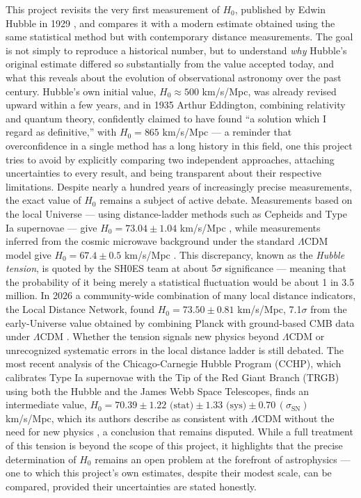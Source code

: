 \documentclass[11pt]{article}
\begin{document}
This project revisits the very first measurement of $H_0$, published by Edwin Hubble in 1929 \citep{hubble1929}, and compares it with a modern estimate obtained using the same statistical method but with contemporary distance measurements. The goal is not simply to reproduce a historical number, but to understand \emph{why} Hubble's original estimate differed so substantially from the value accepted today, and what this reveals about the evolution of observational astronomy over the past century. Hubble's own initial value, $H_0 \approx 500$ km/s/Mpc, was already revised upward within a few years, and in 1935 Arthur Eddington, combining relativity and quantum theory, confidently claimed to have found ``a solution which I regard as definitive,'' with $H_0 = 865$ km/s/Mpc \citep{tully2023} --- a reminder that overconfidence in a single method has a long history in this field, one this project tries to avoid by explicitly comparing two independent approaches, attaching uncertainties to every result, and being transparent about their respective limitations.
Despite nearly a hundred years of increasingly precise measurements, the exact value of $H_0$ remains a subject of active debate. Measurements based on the local Universe --- using distance-ladder methods such as Cepheids and Type Ia supernovae --- give $H_0 = 73.04 \pm 1.04$ km/s/Mpc \citep{riess2022}, while measurements inferred from the cosmic microwave background under the standard $\Lambda$CDM model give $H_0 = 67.4 \pm 0.5$ km/s/Mpc \citep{planck2020}. This discrepancy, known as the \emph{Hubble tension}, is quoted by the SH0ES team at about 5$\sigma$ significance --- meaning that the probability of it being merely a statistical fluctuation would be about 1 in 3.5 million. In 2026 a community-wide combination of many local distance indicators, the Local Distance Network, found $H_0 = 73.50 \pm 0.81$ km/s/Mpc, 7.1$\sigma$ from the early-Universe value obtained by combining Planck with ground-based CMB data under $\Lambda$CDM \citep{h0dn2026}. Whether the tension signals new physics beyond $\Lambda$CDM or unrecognized systematic errors in the local distance ladder is still debated. The most recent analysis of the Chicago-Carnegie Hubble Program (CCHP), which calibrates Type Ia supernovae with the Tip of the Red Giant Branch (TRGB) using both the Hubble and the James Webb Space Telescopes, finds an intermediate value, $H_0 = 70.39 \pm 1.22\text{ (stat)} \pm 1.33\text{ (sys)} \pm 0.70\,(\sigma_{\text{SN}})$ km/s/Mpc, which its authors describe as consistent with $\Lambda$CDM without the need for new physics \citep{freedman2025}, a conclusion that remains disputed. While a full treatment of this tension is beyond the scope of this project, it highlights that the precise determination of $H_0$ remains an open problem at the forefront of astrophysics --- one to which this project's own estimates, despite their modest scale, can be compared, provided their uncertainties are stated honestly.
\end{document}
